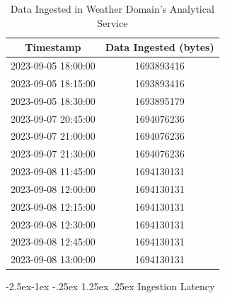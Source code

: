 \documentclass[preprint,12pt]{elsarticle}
\makeatletter
\renewcommand\paragraph{\@startsection{paragraph}{4}{\z@}%
            {-2.5ex\@plus -1ex \@minus -.25ex}%
            {1.25ex \@plus .25ex}%
            {\normalfont\normalsize\itshape}}
\makeatother
\begin{document}
\begin{table}[ht]

  \centering

  \caption{Data Ingested in Weather Domain's Analytical Service}

  \begin{tabular}{|c|c|}

  \hline

  \textbf{Timestamp} & \textbf{Data Ingested (bytes)} \\

  \hline

  2023-09-05 18:00:00 & 1693893416 \\

  2023-09-05 18:15:00 & 1693893416 \\

  2023-09-05 18:30:00 & 1693895179 \\

  2023-09-07 20:45:00 & 1694076236 \\

  2023-09-07 21:00:00 & 1694076236 \\

  2023-09-07 21:30:00 & 1694076236 \\

  2023-09-08 11:45:00 & 1694130131 \\

  2023-09-08 12:00:00 & 1694130131 \\

  2023-09-08 12:15:00 & 1694130131 \\

  2023-09-08 12:30:00 & 1694130131 \\

  2023-09-08 12:45:00 & 1694130131 \\

  2023-09-08 13:00:00 & 1694130131 \\

  \hline

  \end{tabular}

  \label{dataIngestedInWeatherDomainAnalyticalServiceTable}

\end{table}

\paragraph{Ingestion Latency}
\end{document}
